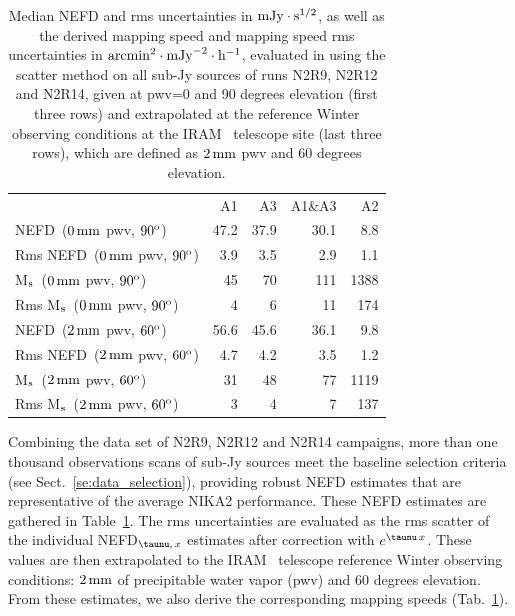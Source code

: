 \begin{table}[!thbp]
  \begin{center}
    \caption[NEFD estimates on all sub-Jy sources]{Median NEFD and rms
      uncertainties in $\rm{mJy}\cdot s^{1/2}$, as well as the derived mapping
      speed and mapping speed rms uncertainties in
    $\rm{arcmin}^2\cdot \rm{mJy}^{-2}\cdot\rm{h}^{-1}$, evaluated
      in using the scatter method on all sub-Jy sources of runs N2R9, N2R12
      and N2R14, given at pwv=0 and 90 degrees elevation (first three rows) and extrapolated at the
      reference Winter observing conditions at the IRAM
      \trentemetre\ telescope site (last three rows), which are defined
      as $2\,\rm{mm}$ pwv and 60 degrees elevation.}
    \label{tab:nefd_astro}
    \begin{tabular}{lrrrr}
      \hline\hline
      \noalign{\smallskip}
                    & A1      &   A3    &   A1\&A3 &    A2 \\
      \noalign{\smallskip}
      \hline
      \noalign{\smallskip}
      NEFD\, \small{($0\,\rm{mm}$ pwv, $90^{\rm{o}}$)}             & 47.2    & 37.9    &    30.1  &    8.8   \\
      Rms NEFD\, \small{($0\,\rm{mm}$ pwv, $90^{\rm{o}}$)}         &  3.9    &  3.5    &     2.9  &    1.1   \\
      M$_{\rm{s}}$\, \small{($0\,\rm{mm}$ pwv, $90^{\rm{o}}$)}      & 45      &  70     &    111   &   1388   \\
      Rms M$_{\rm{s}}$\, \small{($0\,\rm{mm}$ pwv, $90^{\rm{o}}$)}  &  4      &   6     &     11   &    174   \\
      \hline
      \noalign{\smallskip}
      NEFD\, \small{($2\,\rm{mm}$ pwv, $60^{\rm{o}}$)}             & 56.6    & 45.6    &    36.1  &    9.8   \\
      Rms NEFD\, \small{($2\,\rm{mm}$ pwv, $60^{\rm{o}}$)}         &  4.7    & 4.2     &     3.5  &    1.2   \\
      M$_{\rm{s}}$\, \small{($2\,\rm{mm}$ pwv, $60^{\rm{o}}$)}      &  31    & 48       &    77   &   1119   \\
      Rms M$_{\rm{s}}$\, \small{($2\,\rm{mm}$ pwv, $60^{\rm{o}}$)}  &   3    &  4       &     7     &  137   \\
      \hline
    \end{tabular}
\end{center}
\end{table}

Combining the data set of N2R9, N2R12 and N2R14 campaigns, more than one
thousand observations scans of sub-Jy sources meet the baseline selection
criteria (see Sect.~\ref{se:data_selection}), providing robust NEFD estimates
that are representative of the average NIKA2 performance. These NEFD estimates
are gathered in Table~\ref{tab:nefd_astro}. The rms uncertainties are evaluated
as the rms scatter of the individual NEFD$_{\taunu,\, x}$ estimates
after correction with $e^{\taunu\,x}$. These values are then extrapolated to the IRAM
\trentemetre\ telescope reference Winter observing conditions: $2\,\rm{mm}$ of
precipitable water vapor (pwv) and $60$ degrees elevation. From these estimates,
we also derive the corresponding mapping speeds (Tab.~\ref{tab:nefd_astro}).


